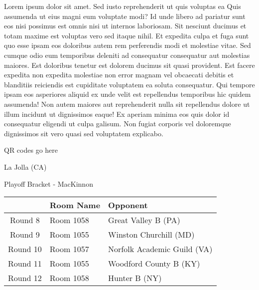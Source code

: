 \documentclass{article}%
\begin{document}
\vspace*{8pt}%
\linebreak%
\newline%
\newline%
Lorem ipsum dolor sit amet. Sed iusto reprehenderit ut quis voluptas ea Quis assumenda ut eius magni eum voluptate modi? Id unde libero ad pariatur sunt eos nisi possimus est omnis nisi ut internos laboriosam. Sit nesciunt ducimus et totam maxime est voluptas vero sed itaque nihil. Et expedita culpa et fuga sunt quo esse ipsam eos doloribus autem rem perferendis modi et molestiae vitae.\newline%
\newline%
Sed cumque odio eum temporibus deleniti ad consequatur consequatur aut molestias maiores. Est doloribus tenetur est dolorem ducimus sit quasi provident. Est facere expedita non expedita molestiae non error magnam vel obcaecati debitis et blanditiis reiciendis est cupiditate voluptatem ea soluta consequatur. Qui tempore ipsam eos asperiores aliquid ex unde velit est repellendus temporibus hic quidem assumenda!\newline%
\newline%
Non autem maiores aut reprehenderit nulla sit repellendus dolore ut illum incidunt ut dignissimos eaque! Ex aperiam minima eos quis dolor id consequatur eligendi ut culpa galisum. Non fugiat corporis vel doloremque dignissimos sit vero quasi sed voluptatem explicabo.\newline%
\newline%
%
\vspace*{30pt}%
\begin{center}%
\begin{Huge}%
QR codes go here%
\end{Huge}%
\end{center}%
\newpage%
\begin{center}%
\begin{Huge}%
La Jolla (CA)%
\end{Huge}%
\vspace*{8pt}%
\linebreak%
\begin{Large}%
Playoff Bracket {-} MacKinnon%
\end{Large}%
\end{center}%
%
\begin{tabularx}{\textwidth}{|c|Y|Y|}%
\hline%
&Room Name&Opponent\\%
\hline%
Round 8&Room 1058&Great Valley B (PA)\\%
Round 9&Room 1055&Winston Churchill (MD)\\%
Round 10&Room 1057&Norfolk Academic Guild (VA)\\%
Round 11&Room 1055&Woodford County B (KY)\\%
Round 12&Room 1058&Hunter B (NY)\\%
\hline%
\end{tabularx}%
\end{document}
